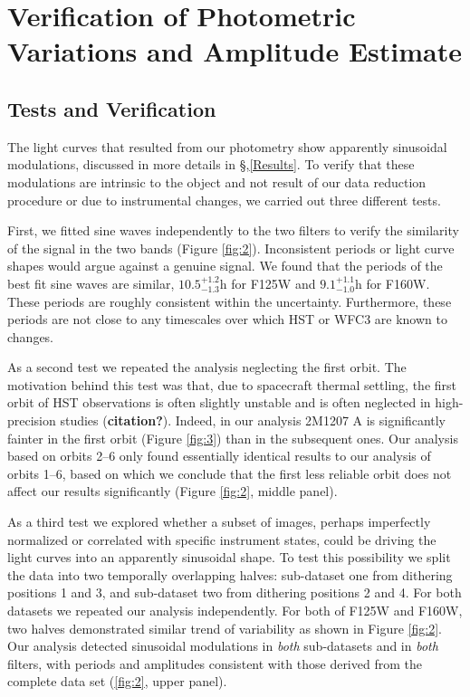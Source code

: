 \documentclass[apj]{emulateapj}
\begin{document}
\section{Verification of Photometric Variations and Amplitude
  Estimate}

\subsection{Tests and Verification}

The light curves that resulted from our photometry show apparently
sinusoidal modulations, discussed in more details in
\S,\ref{Results}. To verify that these modulations are intrinsic to
the object and not result of our data reduction procedure or due to
instrumental changes, we carried out three different tests.

First, we fitted sine waves independently to the two filters to verify
the similarity of the signal in the two bands (Figure \ref{fig:2}). Inconsistent periods or
light curve shapes would argue against a genuine signal.  We found
that the periods of the best fit sine waves are similar,
$10.5^{+1.2}_{-1.3}$h for F125W and $9.1^{+1.1}_{-1.0}$h for
F160W. These periods are roughly consistent within the
uncertainty. Furthermore, these periods are not close to any
timescales over which HST or WFC3 are known to changes.

 As a second test we repeated the analysis neglecting the first
 orbit. The motivation behind this test was that, due to spacecraft
 thermal settling, the first orbit of HST observations is often
 slightly unstable and is often neglected in high-precision studies
 (\textbf{citation?}). Indeed, in our analysis 2M1207 A is
 significantly fainter in the first orbit (Figure \ref{fig:3}) than in
 the subsequent ones.
 Our analysis based on orbits 2--6 only found essentially identical
 results to our analysis of orbits 1--6, based on which we conclude
 that the first less reliable orbit does not affect our results
 significantly (Figure \ref{fig:2}, middle panel).

As a third test we explored whether a subset of images, perhaps
imperfectly normalized or correlated with specific instrument states,
could be driving the light curves into an apparently sinusoidal
shape. To test this possibility we split the data into two temporally
overlapping halves: sub-dataset one from dithering positions 1 and 3,
and sub-dataset two from dithering positions 2 and 4. For both
datasets we repeated our analysis independently.  For both of F125W
and F160W, two halves demonstrated similar trend of variability as
shown in Figure \ref{fig:2}.  Our analysis detected sinusoidal
modulations in {\em both} sub-datasets and in {\em both} filters, with
periods and amplitudes consistent with those derived from the complete
data set (\ref{fig:2}, upper panel).
 
\end{document}

